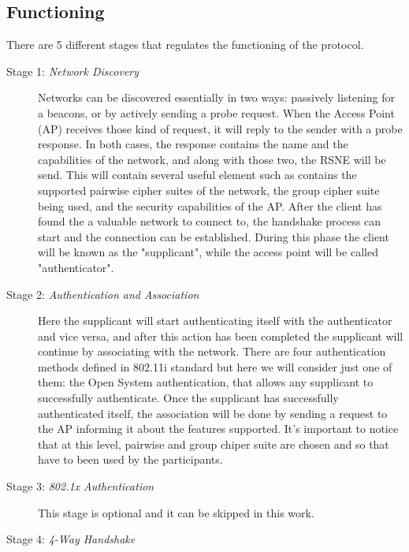\subsection{Functioning}
There are 5 different stages that regulates the functioning of the \fwh protocol.
\begin{description}
  

\item [Stage 1: \textit{Network Discovery}]

Networks can be discovered essentially in two ways: passively listening for a beacons, or by actively sending a probe request. When the Access Point (AP) receives those kind of request, it will reply 
to the sender with a probe response. In both cases, the response contains the name and the capabilities of the network, and along with those two, the RSNE will be send.
This will contain several useful element such as contains the supported pairwise cipher suites of the network, the group cipher suite being used, and the security capabilities of the AP.
After the client has found the a valuable network to connect to, the handshake process can start and the connection can be established.
During this phase the client will be known as the "supplicant", while the access point will be called "authenticator".

\item[Stage 2: \textit{Authentication and Association}]

Here the supplicant will start authenticating itself with the authenticator and vice versa, and after this action has been completed the supplicant will continue by associating with the network.
There are four authentication methods defined in 802.11i standard but here we will consider just one of them: the Open System authentication, that allows any supplicant to successfully authenticate.
Once the supplicant has successfully authenticated itself, the association will be done by sending a request to the AP informing it about the features supported. It's important to notice that at this level,
pairwise and group chiper suite are chosen and so that have to been used by the participants. 

\item[Stage 3: \textit{802.1x Authentication}]

This stage is optional and it can be skipped in this work.

\item[Stage 4: \textit{4-Way Handshake}] 


\end{description}
